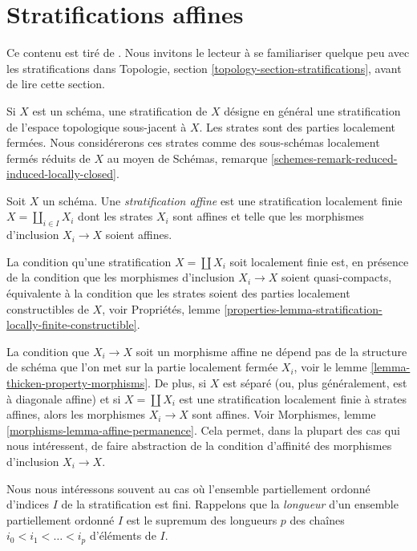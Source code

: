 \section{Stratifications affines}
\label{section-affine-stratifications}

\noindent
Ce contenu est tiré de \cite{RV}. Nous invitons le lecteur à se familiariser quelque peu
avec les stratifications dans
Topologie, section \ref{topology-section-stratifications},
avant de lire cette section.

\medskip\noindent
Si $X$ est un schéma, une stratification de $X$ désigne en général une
stratification de l'espace topologique sous-jacent à $X$.
Les strates sont des parties localement fermées. Nous considérerons ces
strates comme des sous-schémas localement fermés réduits de $X$ au moyen de
Schémas, remarque \ref{schemes-remark-reduced-induced-locally-closed}.

\begin{definition}
\label{definition-affine-stratification}
Soit $X$ un schéma. Une {\it stratification affine} est une
stratification localement finie $X = \coprod_{i \in I} X_i$
dont les strates $X_i$ sont affines et telle que
les morphismes d'inclusion $X_i \to X$ soient affines.
\end{definition}

\noindent
La condition qu'une stratification $X = \coprod X_i$ soit localement finie est,
en présence de la condition que les morphismes d'inclusion $X_i \to X$
soient quasi-compacts, équivalente à la condition que les strates soient des parties localement
constructibles de $X$, voir Propriétés, lemme
\ref{properties-lemma-stratification-locally-finite-constructible}.

\medskip\noindent
La condition que $X_i \to X$ soit un morphisme affine ne dépend pas
de la structure de schéma que l'on met sur la partie localement fermée $X_i$, voir
le lemme \ref{lemma-thicken-property-morphisms}. De plus,
si $X$ est séparé (ou, plus généralement, est à diagonale affine) et si
$X = \coprod X_i$ est une stratification localement finie à strates affines,
alors les morphismes $X_i \to X$ sont affines. Voir
Morphismes, lemme \ref{morphisms-lemma-affine-permanence}.
Cela permet, dans la plupart des cas qui nous intéressent, de faire abstraction de la condition d'affinité des
morphismes d'inclusion $X_i \to X$.

\medskip\noindent
Nous nous intéressons souvent au cas où l'ensemble partiellement ordonné d'indices $I$
de la stratification est fini. Rappelons que la {\it longueur} d'un
ensemble partiellement ordonné $I$ est le supremum des longueurs $p$ des
chaînes $i_0 < i_1 < \ldots < i_p$ d'éléments de $I$.

